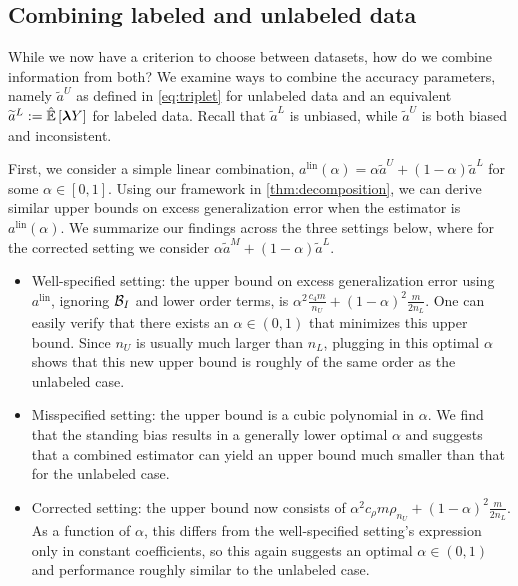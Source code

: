 


\subsection{Combining labeled and unlabeled data}
\vspace{-0.5em}
While we now have a criterion to choose between datasets, how do we combine information from both? We examine ways to combine the accuracy parameters, namely $\widetilde{a}^U$ as defined in \eqref{eq:triplet} for unlabeled data and an equivalent $\widetilde{a}^L := \hat{\mathbb{E}}\left[\bm{\lambda} Y\right]$ for labeled data. Recall that $\widetilde{a}^L$ is unbiased, while $\widetilde{a}^U$ is both biased and inconsistent. 

First, we consider a simple linear combination, $a^{\mathrm{lin}}(\alpha) = \alpha \widetilde{a}^U + (1 - \alpha) \widetilde{a}^L$ for some $\alpha \in [0, 1]$. Using our framework in \ref{thm:decomposition}, we can derive similar upper bounds on excess generalization error when the estimator is $a^{\mathrm{lin}}(\alpha)$. We summarize our findings across the three settings below, where for the corrected setting we consider $\alpha \widetilde{a}^M + (1 - \alpha) \widetilde{a}^L$. 
\begin{itemize}
    \item Well-specified setting: the upper bound on excess generalization error using $a^{\mathrm{lin}}$, ignoring $\mathcal{B}_I$ and lower order terms, is $\alpha^2 \frac{c_4 m}{n_U} + (1 - \alpha)^2 \frac{m}{2n_L}$. One can easily verify that there exists an $\alpha \in (0, 1)$ that minimizes this upper bound. Since $n_U$ is usually much larger than $n_L$, plugging in this optimal $\alpha$ shows that this new upper bound is roughly of the same order as the unlabeled case.
    \item Misspecified setting: the upper bound is a cubic polynomial in $\alpha$. We find that the standing bias results in a generally lower optimal $\alpha$ and suggests that a combined estimator can yield an upper bound much smaller than that for the unlabeled case. 
    \item Corrected setting: the upper bound now consists of $\alpha^2 c_{\rho} m \rho_{n_U} + (1 - \alpha)^2 \frac{m}{2n_L}$. As a function of $\alpha$, this differs from the well-specified setting's expression only in constant coefficients, so this again suggests an optimal $\alpha \in (0, 1)$ and performance roughly similar to the unlabeled case.
\end{itemize}

